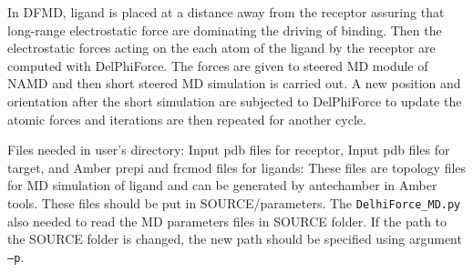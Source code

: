 \documentclass[9pt,tutorial]{livecoms}
\begin{document}
In DFMD, ligand is placed at a distance away from the receptor assuring that long-range electrostatic force are dominating the driving of binding. Then the electrostatic forces acting on the each atom of the ligand by the receptor are computed with DelPhiForce\cite{li2017delphiforce}. The forces are given to steered MD module of NAMD and then short steered MD simulation is carried out. A new position and orientation after the short simulation are subjected to DelPhiForce to update the atomic forces and iterations are then repeated for another cycle.

Files needed in user’s directory:
Input pdb files for receptor, Input pdb files for target, and Amber prepi and frcmod files for ligands: These files are topology files for MD simulation of ligand and can be generated by antechamber in Amber tools. These files should be put in SOURCE/parameters. The \texttt{DelhiForce\_MD.py} also needed to read the MD parameters files in SOURCE folder. If the path to the SOURCE folder is changed, the new path should be specified using argument \texttt{–p}.
\end{document}
